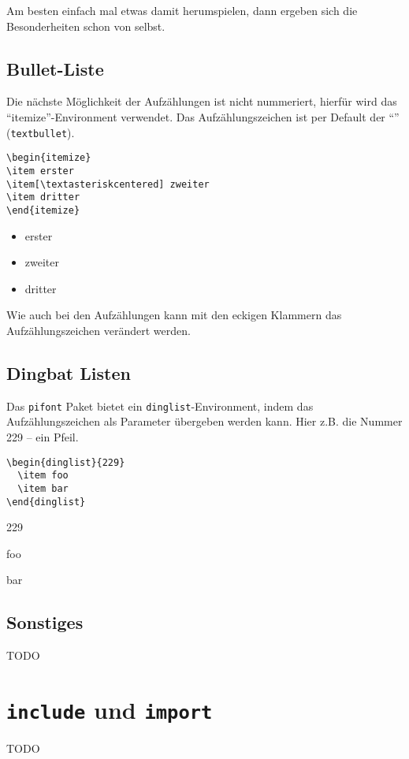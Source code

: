 Am besten einfach mal etwas damit herumspielen, dann ergeben sich die Besonderheiten schon von selbst.

\subsection{Bullet-Liste}

Die nächste Möglichkeit der Aufzählungen ist nicht nummeriert, hierfür wird das "`itemize"'-Environment verwendet. Das Aufzählungszeichen ist per Default der "`\textbullet"' (\texttt{textbullet}).
\begin{verbatim}
\begin{itemize}
\item erster
\item[\textasteriskcentered] zweiter
\item dritter
\end{itemize}
\end{verbatim}

\begin{itemize}
\item erster
\item[\textasteriskcentered] zweiter
\item dritter
\end{itemize}
Wie auch bei den Aufzählungen kann mit den eckigen Klammern das Aufzählungszeichen verändert werden. 

\subsection{Dingbat Listen}

Das \texttt{pifont} Paket bietet ein \texttt{dinglist}-Environment, indem das Aufzählungszeichen als Parameter übergeben werden kann. Hier z.B. die Nummer 229 -- ein Pfeil.

\begin{verbatim}
\begin{dinglist}{229}
  \item foo
  \item bar
\end{dinglist}
\end{verbatim}

\begin{dinglist}{229}
  \item foo
  \item bar
\end{dinglist}

\subsection{Sonstiges}

TODO

\section{\texttt{include} und \texttt{import}}\label{sect:import}

TODO